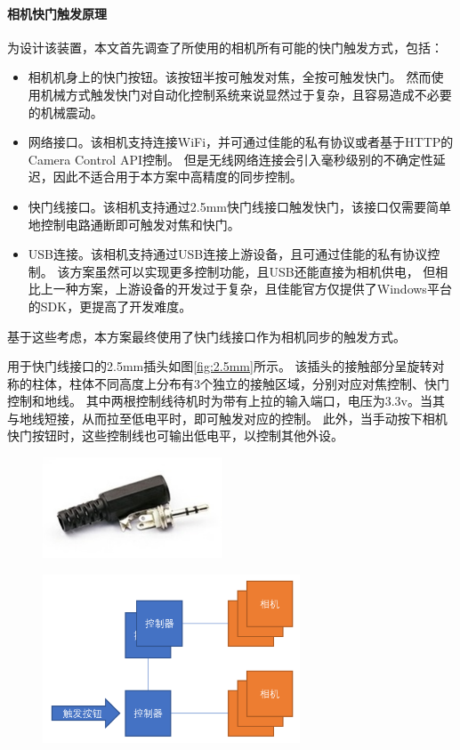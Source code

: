 \paragraph{相机快门触发原理}

为设计该装置，本文首先调查了所使用的相机所有可能的快门触发方式，包括：
\begin{itemize}
\item 相机机身上的快门按钮。该按钮半按可触发对焦，全按可触发快门。
然而使用机械方式触发快门对自动化控制系统来说显然过于复杂，且容易造成不必要的机械震动。
\item 网络接口。该相机支持连接WiFi，并可通过佳能的私有协议或者基于HTTP的Camera Control API控制。
但是无线网络连接会引入毫秒级别的不确定性延迟，因此不适合用于本方案中高精度的同步控制。
\item 快门线接口。该相机支持通过2.5mm快门线接口触发快门，该接口仅需要简单地控制电路通断即可触发对焦和快门。
\item USB连接。该相机支持通过USB连接上游设备，且可通过佳能的私有协议控制。
该方案虽然可以实现更多控制功能，且USB还能直接为相机供电，
但相比上一种方案，上游设备的开发过于复杂，且佳能官方仅提供了Windows平台的SDK，更提高了开发难度。
\end{itemize}
基于这些考虑，本方案最终使用了快门线接口作为相机同步的触发方式。

用于快门线接口的2.5mm插头如图\ref{fig:2.5mm}所示。
该插头的接触部分呈旋转对称的柱体，柱体不同高度上分布有3个独立的接触区域，分别对应对焦控制、快门控制和地线。
其中两根控制线待机时为带有上拉的输入端口，电压为3.3v。当其与地线短接，从而拉至低电平时，即可触发对应的控制。
此外，当手动按下相机快门按钮时，这些控制线也可输出低电平，以控制其他外设。

\begin{figure}
\centering
\begin{minipage}{.5\textwidth}
    \centering
    \includegraphics[height=3cm]{figures/2.5mm}
    \label{fig:2.5mm}
\end{minipage}%
\begin{minipage}{.5\textwidth}
    \centering
    \includegraphics[height=5cm]{figures/passive_sync_topo}
    \label{fig:passive_sync_topo}
\end{minipage}%
\end{figure}

